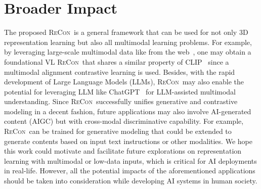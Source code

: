\documentclass{article}
\theoremstyle{plain}
\theoremstyle{definition}
\theoremstyle{remark}
\def\recon{{\scshape ReCon}}
\begin{document}
\section*{Broader Impact}
The proposed \recon\ is a general framework that can be used for not only 3D representation learning but also all multimodal learning problems.
For example, by leveraging large-scale multimodal data like from the web~\citep{LAION5B2022}, one may obtain a foundational VL \recon\ that shares a similar property of CLIP~\citep{CLIP} since a multimodal alignment contrastive learning is used.
Besides, with the rapid development of Large Language Models (LLMs), \recon\ may also enable the potential for leveraging LLM like ChatGPT~\citep{ChatGPT} for LLM-assisted multimodal understanding.
Since \recon\ successfully unifies generative and contrastive modeling in a decent fashion, future applications may also involve AI-generated content (AIGC) but with cross-modal discriminative capability. For example, \recon\ can be trained for generative modeling that could be extended to generate contents based on input text instructions or other modalities.
We hope this work could motivate and facilitate future explorations on representation learning with multimodal or low-data inputs, which is critical for AI deployments in real-life.
However, all the potential impacts of the aforementioned applications should be taken into consideration while developing AI systems in human society.
 
\end{document}
